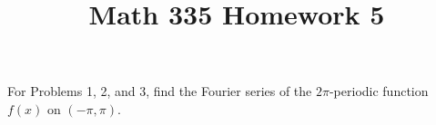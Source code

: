 \documentclass{article}
\title{Math 335 Homework 5}
\begin{document}
\maketitle
{}
For Problems 1, 2, and 3,
find the Fourier series of the $2\pi$-periodic function $f(x)$ on  $(-\pi,\pi  )$.









\end{document}

